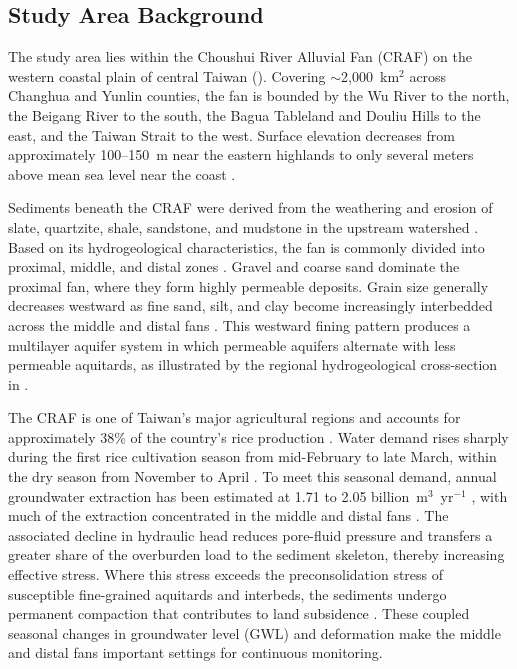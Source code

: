 \subsection{Study Area Background}
\label{subsec:study_area}

The study area lies within the Choushui River Alluvial Fan (CRAF) on the western coastal plain of central Taiwan (). Covering $\sim$2,000~km$^2$ across Changhua and Yunlin counties, the fan is bounded by the Wu River to the north, the Beigang River to the south, the Bagua Tableland and Douliu Hills to the east, and the Taiwan Strait to the west. Surface elevation decreases from approximately 100--150~m near the eastern highlands to only several meters above mean sea level near the coast \citep{survey_project_1999, liu_characterization_2004}.

Sediments beneath the CRAF were derived from the weathering and erosion of slate, quartzite, shale, sandstone, and mudstone in the upstream watershed \citep{liu_characterization_2004, hung2015_multiple}. Based on its hydrogeological characteristics, the fan is commonly divided into proximal, middle, and distal zones \citep{survey_project_1999}. Gravel and coarse sand dominate the proximal fan, where they form highly permeable deposits. Grain size generally decreases westward as fine sand, silt, and clay become increasingly interbedded across the middle and distal fans \citep{liu_characterization_2004, chen2001_stratigraphy}. This westward fining pattern produces a multilayer aquifer system in which permeable aquifers alternate with less permeable aquitards, as illustrated by the regional hydrogeological cross-section in .

The CRAF is one of Taiwan's major agricultural regions and accounts for approximately 38\% of the country's rice production \citep{chang2022_wetanddry}. Water demand rises sharply during the first rice cultivation season from mid-February to late March, within the dry season from November to April \citep{chang2022_wetanddry, chang_rice-field_2020}. To meet this seasonal demand, annual groundwater extraction has been estimated at 1.71 to 2.05 billion~m$^3$~yr$^{-1}$ \citep{tseng_estimating_2024}, with much of the extraction concentrated in the middle and distal fans \citep{hung_exploring_2024}. The associated decline in hydraulic head reduces pore-fluid pressure and transfers a greater share of the overburden load to the sediment skeleton, thereby increasing effective stress. Where this stress exceeds the preconsolidation stress of susceptible fine-grained aquitards and interbeds, the sediments undergo permanent compaction that contributes to land subsidence \citep{liu_characterization_2004, hung2015_multiple, gambolati_2015}. These coupled seasonal changes in groundwater level (GWL) and deformation make the middle and distal fans important settings for continuous monitoring.

